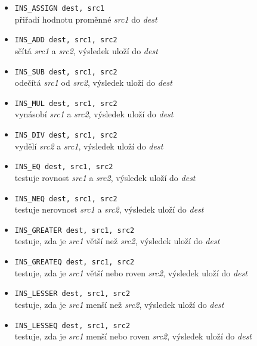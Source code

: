 \documentclass[a4paper, 12pt]{article}
\begin{document}
\begin{itemize}
	\item{\texttt{INS\_ASSIGN dest, src1}} \\
	přiřadí hodnotu proměnné \textit{src1} do \textit{dest}
	
	\item{\texttt{INS\_ADD dest, src1, src2}} \\
	sčítá \textit{src1} a \textit{src2}, výsledek uloží do \textit{dest}
	
	\item{\texttt{INS\_SUB dest, src1, src2}} \\
	odečítá \textit{src1} od \textit{src2}, výsledek uloží do \textit{dest}
	
	\item{\texttt{INS\_MUL dest, src1, src2}} \\
	vynásobí \textit{src1} a \textit{src2}, výsledek uloží do \textit{dest}
	
	\item{\texttt{INS\_DIV dest, src1, src2}} \\ 
	vydělí \textit{src2} a \textit{src1}, výsledek uloží do \textit{dest}
	
	\item{\texttt{INS\_EQ dest, src1, src2}} \\ 
	testuje rovnost \textit{src1} a \textit{src2}, výsledek uloží do \textit{dest}
	
	\item{\texttt{INS\_NEQ dest, src1, src2}} \\ 
	testuje nerovnost \textit{src1} a \textit{src2}, výsledek uloží do \textit{dest}
	
	\item{\texttt{INS\_GREATER dest, src1, src2}} \\ 
	testuje, zda je \textit{src1} větší než \textit{src2}, výsledek uloží do \textit{dest}
	
	\item{\texttt{INS\_GREATEQ dest, src1, src2}} \\ 
	testuje, zda je \textit{src1} větší nebo roven \textit{src2}, výsledek uloží do \textit{dest}
	
	\item{\texttt{INS\_LESSER dest, src1, src2}} \\ 
	testuje, zda je \textit{src1} menší než \textit{src2}, výsledek uloží do \textit{dest}
	
	\item{\texttt{INS\_LESSEQ dest, src1, src2}} \\ 
	testuje, zda je \textit{src1} menší nebo roven \textit{src2}, výsledek uloží do \textit{dest}
	

\end{itemize}
\end{document}
